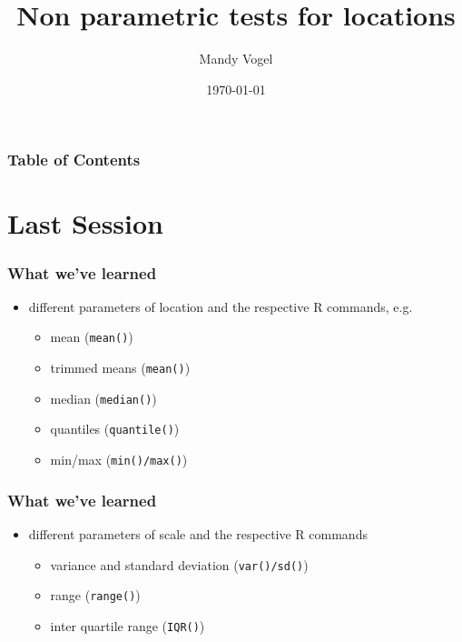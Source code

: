 \documentclass[xcolor={table}]{beamer}
\begin{document}
\title{Non parametric tests for locations}   
\author{Mandy Vogel} 
\date{\today}

\begin{frame}
\titlepage
\end{frame}

\begin{frame}
\frametitle{Table of Contents}\tableofcontents
\end{frame}


\section{Last Session}

\begin{frame}\frametitle{What we've learned}
  \begin{itemize}
  \item different parameters of location and the respective R commands, e.g.
    \begin{itemize}
    \item mean (\texttt{mean()})
    \item trimmed means (\texttt{mean()})
    \item median (\texttt{median()})
    \item quantiles (\texttt{quantile()})
    \item min/max (\texttt{min()/max()})
    \end{itemize}
  \end{itemize}
\end{frame}

\begin{frame}\frametitle{What we've learned}
  \begin{itemize}
  \item different parameters of scale and the respective R commands
    \begin{itemize}
    \item variance and standard deviation (\texttt{var()/sd()})
    \item range (\texttt{range()})
    \item inter quartile range (\texttt{IQR()})
    \end{itemize}
  \end{itemize}
\end{frame}
\end{document}
